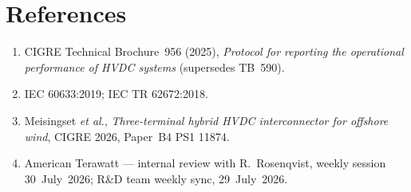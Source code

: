 \section*{References}
\begin{enumerate}\setlength{\itemsep}{0.15em}
  \item CIGRE Technical Brochure~956 (2025), \emph{Protocol for reporting the
        operational performance of HVDC systems} (supersedes TB~590).
  \item IEC 60633:2019; IEC TR 62672:2018.
  \item Meisingset \emph{et al.}, \emph{Three-terminal hybrid HVDC
        interconnector for offshore wind}, CIGRE 2026, Paper~B4 PS1 11874.
  \item American Terawatt --- internal review with R.~Rosenqvist, weekly session
        30~July~2026; R\&D team weekly sync, 29~July~2026.
\end{enumerate}
